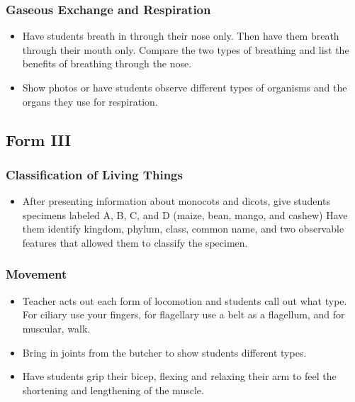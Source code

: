 \subsubsection{Gaseous Exchange and Respiration}
\begin{itemize}
\item Have students breath in through their nose only.  Then have them breath through their mouth only.  Compare the two types of breathing and list the benefits of breathing through the nose.
\item Show photos or have students observe different types of organisms and the organs they use for respiration.
\end{itemize}

\subsection{Form III}
\subsubsection{Classification of Living Things}
\begin{itemize}
\item After presenting information about monocots and dicots, give students specimens labeled A, B, C, and D (maize, bean, mango, and cashew) Have them identify kingdom, phylum, class, common name, and two observable features that allowed them to classify the specimen.
\end{itemize}

\subsubsection{Movement}
\begin{itemize}
\item Teacher acts out each form of locomotion and students call out what type. For ciliary use your fingers, for flagellary use a belt as a flagellum, and for muscular, walk.
\item Bring in joints from the butcher to show students different types.
\item Have students grip their bicep, flexing and relaxing their arm to feel the shortening and lengthening of the muscle.
\end{itemize}

